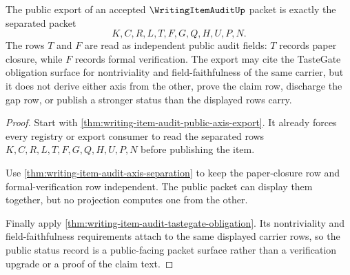 \begin{theorem}
\label{thm:writing-item-audit-public-status}
The public export of an accepted $\WritingItemAuditUp$ packet is exactly the separated packet
$$
K,C,R,L,T,F,G,Q,H,U,P,N.
$$
The rows $T$ and $F$ are read as independent public audit fields: $T$ records paper closure, while $F$ records formal verification. The export may cite the TasteGate obligation surface for nontriviality and field-faithfulness of the same carrier, but it does not derive either axis from the other, prove the claim row, discharge the gap row, or publish a stronger status than the displayed rows carry.
\end{theorem}
\begin{proof}
Start with \autoref{thm:writing-item-audit-public-axis-export}. It already forces every registry or export consumer to read the separated rows $K,C,R,L,T,F,G,Q,H,U,P,N$ before publishing the item.

Use \autoref{thm:writing-item-audit-axis-separation} to keep the paper-closure row and formal-verification row independent. The public packet can display them together, but no projection computes one from the other.

Finally apply \autoref{thm:writing-item-audit-tastegate-obligation}. Its nontriviality and field-faithfulness requirements attach to the same displayed carrier rows, so the public status record is a public-facing packet surface rather than a verification upgrade or a proof of the claim text.
\end{proof}

